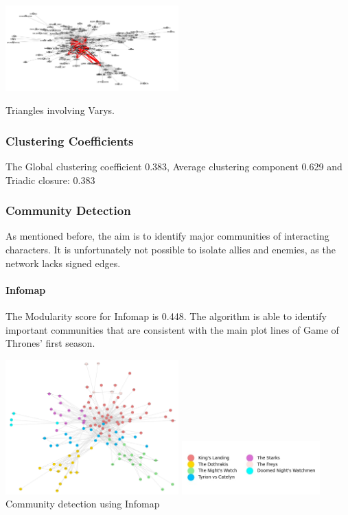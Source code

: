 \documentclass[10pt,twocolumn,letterpaper]{article}
\begin{document}
\begin{center}
    \includegraphics[width=0.5\textwidth]{img/s1/triangles_varys.jpg}
    \caption{\small{Triangles involving Varys.}}
\end{center}

\subsubsection{Clustering Coefficients}

The Global clustering coefficient 0.383, Average clustering component 0.629 and Triadic closure: 0.383

\subsubsection{Community Detection}

As mentioned before, the aim is to identify major communities of interacting characters. It is unfortunately not possible to isolate allies and enemies, as the network lacks signed edges.

\paragraph{Infomap} The Modularity score for Infomap is 0.448. The algorithm is able to identify important communities that are consistent with the main plot lines of Game of Thrones' first season. 

\begin{center}
    \includegraphics[width=0.5\textwidth]{img/s1/communities_infomap.jpg}
    \includegraphics[width=0.4\textwidth]{img/s1/infomap_legend.jpg} \\
    \caption{\small{Community detection using Infomap}}
\end{center}
\end{document}
